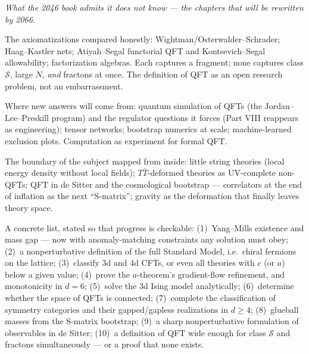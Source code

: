 
\noin \emph{What the 2046 book admits it does not know --- the chapters that will be rewritten by 2066.}

The axiomatizations compared honestly: Wightman/Osterwalder--Schrader; Haag--Kastler nets; Atiyah--Segal functorial QFT and Kontsevich--Segal allowability; factorization algebras. Each captures a fragment; none captures class $\mathcal{S}$, large $N$, \emph{and} fractons at once. The definition of QFT as an open research problem, not an embarrassment.

Where new answers will come from: quantum simulation of QFTs (the Jordan--Lee--Preskill program) and the regulator questions it forces (Part VIII reappears as engineering); tensor networks; bootstrap numerics at scale; machine-learned exclusion plots. Computation as experiment for formal QFT.

The boundary of the subject mapped from inside: little string theories (local energy density without local fields); $T\bar T$-deformed theories as UV-complete non-QFTs; QFT in de Sitter and the cosmological bootstrap --- correlators at the end of inflation as the next ``S-matrix''; gravity as the deformation that finally leaves theory space.

A concrete list, stated so that progress is checkable: (1)~Yang--Mills existence and mass gap --- now with anomaly-matching constraints any solution must obey; (2)~a nonperturbative definition of the full Standard Model, i.e.\ chiral fermions on the lattice; (3)~classify 3d and 4d CFTs, or even all theories with $c$ (or $a$) below a given value; (4)~prove the $a$-theorem's gradient-flow refinement, and monotonicity in $d=6$; (5)~solve the 3d Ising model analytically; (6)~determine whether the space of QFTs is connected; (7)~complete the classification of symmetry categories and their gapped/gapless realizations in $d \ge 4$; (8)~glueball masses from the S-matrix bootstrap; (9)~a sharp nonperturbative formulation of observables in de Sitter; (10)~a definition of QFT wide enough for class $\mathcal{S}$ and fractons simultaneously --- or a proof that none exists.

